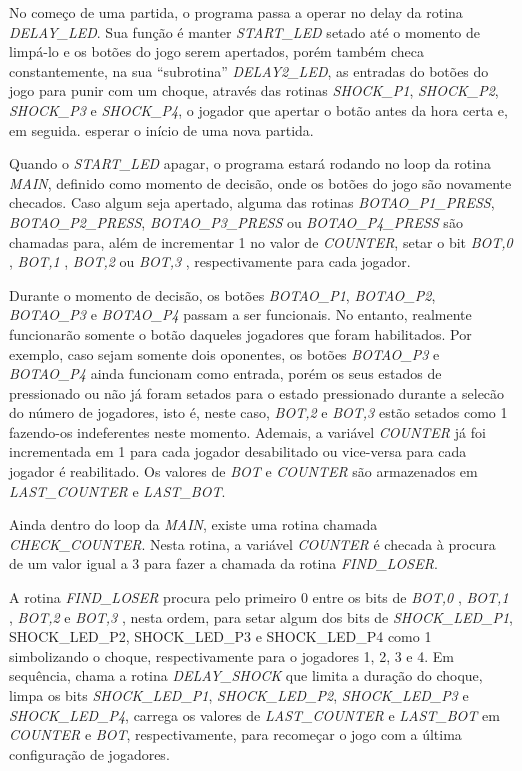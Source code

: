 \documentclass[article]{IEEEtran}
\begin{document}
No começo de uma partida, o programa passa a operar no delay da rotina \textit{DELAY\_LED}. Sua função é manter \textit{START\_LED} setado até o momento de limpá-lo e os botões do jogo serem apertados, porém também checa constantemente, na sua ``subrotina'' \textit{DELAY2\_LED}, as entradas do botões do jogo para punir com um choque, através das rotinas \textit{SHOCK\_P1}, \textit{SHOCK\_P2}, \textit{SHOCK\_P3} e \textit{SHOCK\_P4}, o jogador que apertar o botão antes da hora certa e, em seguida. esperar o início de uma nova partida.

Quando o \textit{START\_LED} apagar, o programa estará rodando no loop da rotina \textit{MAIN}, definido como momento de decisão, onde os botões do jogo são novamente checados. Caso algum seja apertado, alguma das rotinas \textit{BOTAO\_P1\_PRESS}, \textit{BOTAO\_P2\_PRESS}, \textit{BOTAO\_P3\_PRESS} ou \textit{BOTAO\_P4\_PRESS} são chamadas para, além de incrementar 1 no valor de \textit{COUNTER}, setar o bit \textit{BOT,0} , \textit{BOT,1} , \textit{BOT,2} ou \textit{BOT,3} , respectivamente para cada jogador.

Durante o momento de decisão, os botões \textit{BOTAO\_P1}, \textit{BOTAO\_P2}, \textit{BOTAO\_P3} e \textit{BOTAO\_P4} passam a ser funcionais. No entanto, realmente funcionarão somente o botão daqueles jogadores que foram habilitados. Por exemplo, caso sejam somente dois oponentes, os botões \textit{BOTAO\_P3} e \textit{BOTAO\_P4} ainda funcionam como entrada, porém os seus estados de pressionado ou não já foram setados para o estado pressionado durante a selecão do número de jogadores, isto é, neste caso, \textit{BOT,2} e \textit{BOT,3} estão setados como 1 fazendo-os indeferentes neste momento. Ademais, a variável \textit{COUNTER} já foi incrementada em 1 para cada jogador desabilitado ou vice-versa para cada jogador é reabilitado. Os valores de \textit{BOT} e \textit{COUNTER} são armazenados em \textit{LAST\_COUNTER} e \textit{LAST\_BOT}. 

Ainda dentro do loop da \textit{MAIN}, existe uma rotina chamada \textit{CHECK\_COUNTER}. Nesta rotina, a variável \textit{COUNTER} é checada à procura de um valor igual a 3 para fazer a chamada da rotina \textit{FIND\_LOSER}.

A rotina \textit{FIND\_LOSER} procura pelo primeiro 0 entre os bits de \textit{BOT,0} , \textit{BOT,1} , \textit{BOT,2} e \textit{BOT,3} , nesta ordem, para setar algum dos bits de \textit{SHOCK\_LED\_P1}, {SHOCK\_LED\_P2}, {SHOCK\_LED\_P3} e {SHOCK\_LED\_P4} como 1 simbolizando o choque, respectivamente para o jogadores 1, 2, 3 e 4. Em sequência, chama a rotina \textit{DELAY\_SHOCK} que limita a duração do choque, limpa os bits \textit{SHOCK\_LED\_P1}, \textit{SHOCK\_LED\_P2}, \textit{SHOCK\_LED\_P3} e \textit{SHOCK\_LED\_P4}, carrega os valores de \textit{LAST\_COUNTER} e \textit{LAST\_BOT} em \textit{COUNTER} e \textit{BOT}, respectivamente, para recomeçar o jogo com a última configuração de jogadores.
\end{document}
